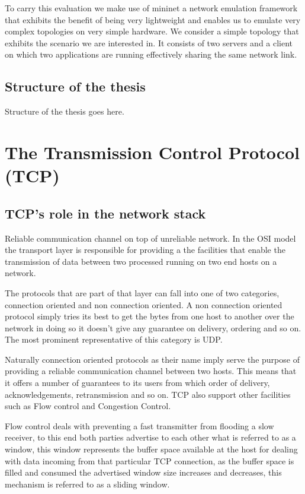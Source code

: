 \documentclass[type=bsc,accentcolor=tud9a,colorback,11pt,paper=a4report]{tudthesis}
\begin{document}
	To carry this evaluation we make use of mininet a network emulation framework that 
	exhibits the benefit of being very lightweight and enables us to
	emulate very complex topologies on very simple hardware. We
	consider a simple topology that exhibits the scenario we are
	interested in. It consists of two servers and a client on
	which two applications are running effectively sharing the
	same network link.
	\section{Structure of the thesis}
Structure of the thesis goes here.
\chapter{The Transmission Control Protocol (TCP)}
	\section{TCP's role in the network stack}
Reliable communication channel on top of unreliable network. In the OSI model the transport layer is responsible for providing a the facilities that enable the 
transmission of data between two processed running on two end hosts on a 
network. 

The protocols that
are part of that layer can fall into one of two categories, connection oriented 
and non connection oriented. A non connection oriented protocol simply tries its best to get the bytes from one host to another over the network
in doing so it doesn't give any guarantee on delivery, ordering and so on. 
The most prominent representative of this category is UDP. 

Naturally connection 
oriented protocols as their name imply serve the purpose of providing a reliable
communication channel between two hosts. This means that it offers a number of 
guarantees to its users from which order of delivery, acknowledgements, 
retransmission and so on. TCP also support other facilities such as Flow control
and Congestion Control. 

Flow control deals with preventing a fast transmitter 
from flooding a slow receiver, to this end both parties advertise to each other 
what is referred to as a window, this window represents the buffer space 
available at the host for dealing with data incoming from that particular TCP 
connection, as the buffer space is filled and consumed the advertised window 
size increases and decreases, this mechanism is referred to as a sliding window.
\end{document}

